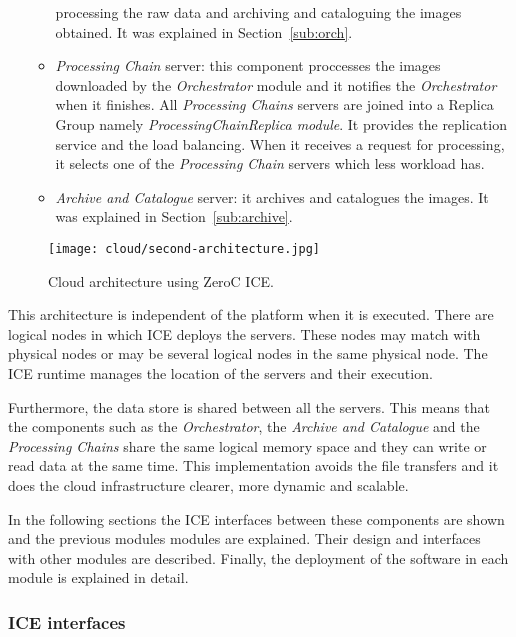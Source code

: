 \begin{itemize}
\begin{itemize}
  processing the raw data and archiving and cataloguing the images obtained. It was explained in Section~\ref{sub:orch}.
\item \emph{Processing Chain} server: this component proccesses the images downloaded by the
  \emph{Orchestrator} module and it notifies the \emph{Orchestrator} when it
  finishes. All \emph{Processing Chains} servers are joined into a Replica Group namely
  \emph{ProcessingChainReplica module}. It provides the replication service and the load
  balancing. When it receives a request for processing, it selects one of the 
  \emph{Processing Chain} servers which less workload has.
\item \emph{Archive and Catalogue} server: it archives and catalogues the images. It was explained in Section~\ref{sub:archive}.
\end{itemize}
\end{itemize}
\begin{figure}[!h]
\begin{center}
\texttt{[image: cloud/second-architecture.jpg]}
\caption{Cloud architecture using ZeroC ICE.}
\label{fig:ice-architecture}
\end{center}
\end{figure}


This architecture is independent of the platform when it is executed. There are
logical nodes in which ICE deploys the servers. These nodes may match with
physical nodes or may be several logical nodes in the same physical node. The
ICE runtime manages the location of the servers and their execution.

Furthermore, the data store is shared between all the servers. This means that the
components such as the \emph{Orchestrator}, the \emph{Archive and Catalogue} and the
\emph{Processing Chains} share the same logical memory space and they can write or read data
at the same time. This implementation avoids the file transfers and it does the
cloud infrastructure clearer, more dynamic and scalable.

In the following sections the  ICE interfaces between these components are
shown and the previous modules modules are explained. Their design and
interfaces with other modules are described. Finally, the
deployment of the software in each module is explained in detail.

\subsubsection{ICE interfaces}

